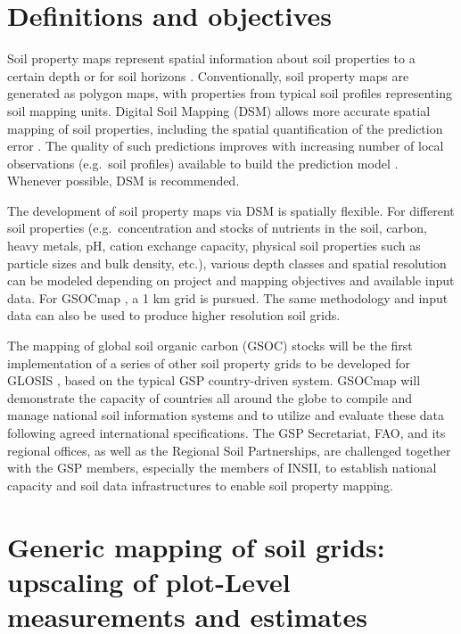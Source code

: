 \documentclass[10pt,b5paper,]{book}
\theoremstyle{definition}
\theoremstyle{definition}
\theoremstyle{definition}
\theoremstyle{remark}
\begin{document}
\hypertarget{definitions-and-objectives}{%
\section{Definitions and objectives}\label{definitions-and-objectives}}

 Soil property maps represent spatial
information about soil properties to a certain depth or for soil
horizons . Conventionally, soil property maps are
generated as polygon maps, with properties from typical soil profiles
representing soil mapping units. Digital Soil Mapping (DSM)
 allows more accurate spatial mapping
of soil properties, including the spatial quantification of the
prediction error . The quality of such
predictions improves with increasing number of local observations
(e.g.~soil profiles) available to build the prediction model
. Whenever possible, DSM is recommended.

The development of soil property maps via DSM is spatially flexible. For
different soil properties (e.g.~concentration and stocks of nutrients in
the soil, carbon, heavy metals, pH, cation exchange capacity, physical
soil properties such as particle sizes and bulk density, etc.), various
depth classes and spatial resolution can be modeled depending on project
and mapping objectives and available input data. For GSOCmap
, a 1 km grid is
pursued. The same methodology and input data can also be used to produce
higher resolution soil grids.

The mapping of global soil organic carbon (GSOC) stocks will be the
first implementation of a series of other soil property grids to be
developed for GLOSIS , based
on the typical GSP country-driven system. GSOCmap will demonstrate the
capacity of countries all around the globe to compile and manage
national soil information systems and to utilize and evaluate these data
following agreed international specifications. The GSP Secretariat, FAO,
and its regional offices, as well as the Regional Soil Partnerships, are
challenged together with the GSP members, especially the members of
INSII, to establish national capacity and soil data infrastructures to
enable soil property mapping. 

\hypertarget{generic-mapping-of-soil-grids-upscaling-of-plot-level-measurements-and-estimates}{%
\section{Generic mapping of soil grids: upscaling of plot-Level
measurements and
estimates}\label{generic-mapping-of-soil-grids-upscaling-of-plot-level-measurements-and-estimates}}
\end{document}
